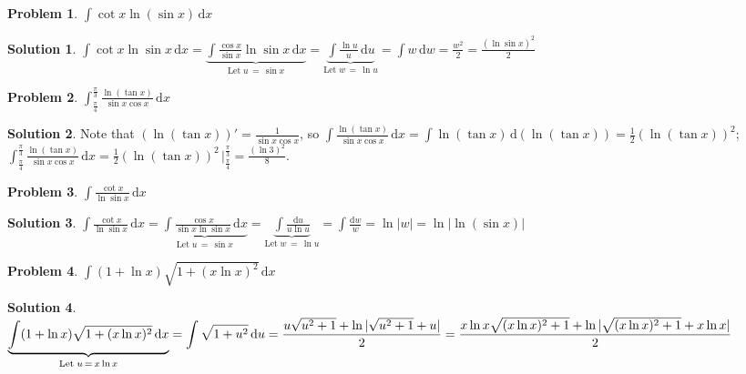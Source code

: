 \documentclass[11pt,a4paper]{article}
\newcommand{\ds}{\displaystyle}
\theoremstyle{definition}
\newtheorem*{problem}{Problem}
\newtheorem*{solution}{Solution}
\begin{document}
\begin{problem}
  $\ds\int\cot x \ln(\sin x)\,\text{d}x$
\end{problem}

\begin{solution}
  $\ds\int\!\cot x\ln \sin x\,\text{d}x = \underbrace{\int\!\frac{\cos x}{\sin x}\ln \sin x\,\text{d}x}_{\text{Let}\;u\,=\,\sin x} = \underbrace{\int\!\frac{\ln u}{u}\,\text{d}u}_{\text{Let}\;w\,=\,\ln u} = \int\!w\,\text{d}w = \frac{w^2}{2} = \frac{(\ln\sin x)^2}{2}$
\end{solution}

\begin{problem}
  $\ds\int_{\frac{\pi}{4}}^{\frac{\pi}{3}}\!\frac{\ln(\tan x)}{\sin x \cos x}\,\text{d}x$
\end{problem}

\begin{solution}
  Note that $\ds(\ln(\tan x))' = \frac{1}{\sin x\cos x}$, so $\ds\int\!\frac{\ln(\tan x)}{\sin x \cos x}\,\text{d}x = \int\!\ln(\tan x)\,\text{d}(\ln(\tan x)) = \frac{1}{2}(\ln(\tan x))^2$; $\ds\int_{\frac{\pi}{4}}^{\frac{\pi}{3}}\!\frac{\ln(\tan x)}{\sin x \cos x}\,\text{d}x = \frac{1}{2}(\ln(\tan x))^2\,\Big|_{\frac{\pi}{4}}^{\frac{\pi}{3}} = \frac{(\ln 3)^2}{8}$. 
\end{solution}

\begin{problem}
  $\ds\int\!\frac{\cot x}{\ln \sin x}\,\text{d}x$
\end{problem}

\begin{solution}
  $\ds\int\!\frac{\cot x}{\ln \sin x}\,\text{d}x = \underbrace{\int\!\frac{\cos x}{\sin x\ln \sin x}\,\text{d}x}_{\text{Let}\;u\,=\,\sin x} = \underbrace{\int\!\frac{\text{d}u}{u\ln u}}_{\text{Let}\;w\,=\,\ln u} = \int\!\frac{\text{d}w}{w} = \ln |w| = \ln|\ln(\sin x)|$
\end{solution}

\begin{problem}
  $\ds\int(1 + \ln x)\sqrt{1 + (x \ln x)^2}\,\text{d}x$
\end{problem}

\begin{solution}
  $\ds\underbrace{\int(1 + \ln x)\sqrt{1 + (x \ln x)^2}\,\text{d}x}_{\text{Let}\;u\,=\,x\ln x} = \int\sqrt{1 + u^2}\,\text{d}u = \frac{u\sqrt{u^2 + 1} + \ln|\sqrt{u^2 + 1} + u|}{2} \\= \frac{x\ln x\sqrt{(x\ln x)^2 + 1} + \ln|\sqrt{(x\ln x)^2 + 1} + x\ln x|}{2}$
\end{solution}
\end{document}
